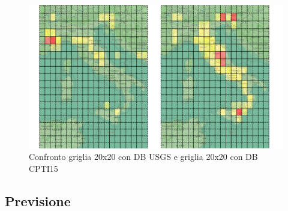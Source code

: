 \begin{figure}[H]
   \centering
   \includegraphics[width=1.0\textwidth]{images/20x20_USGS_vs_CPTI15.jpg}
   \caption{Confronto griglia 20x20 con DB USGS e griglia 20x20 con DB CPTI15}
\end{figure}

\subsection{Previsione}

